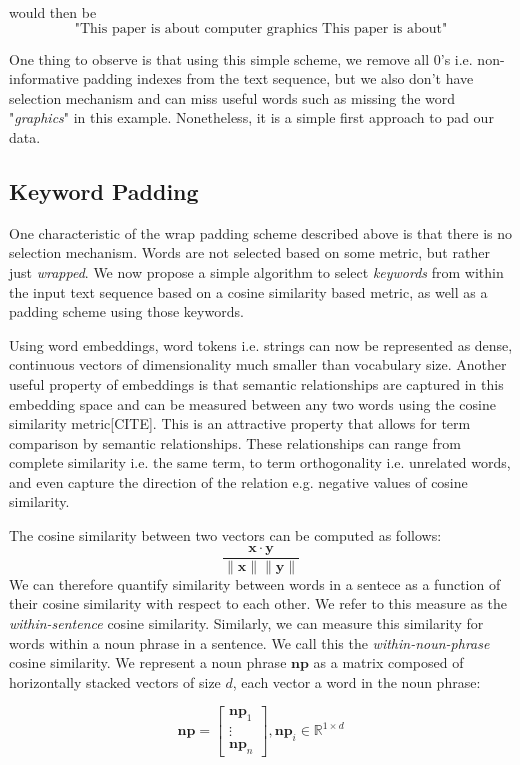 would then be
\[\text{"This paper is about computer graphics This paper is about"}\]

One thing to observe is that using this simple scheme, we remove all 0's i.e. non-informative padding indexes
from the text sequence, but we also don't have selection mechanism and can miss useful words such as missing the
word "\textit{graphics}" in this example. Nonetheless, it is a simple first approach to pad our data.

\subsection{Keyword Padding}
One characteristic of the wrap padding scheme described above is that there is no selection mechanism. Words are not selected based on some metric,
but rather just \textit{wrapped}. We now propose a simple algorithm to select \textit{keywords} from within the input text sequence
based on a cosine similarity based metric, as well as a padding scheme using those keywords.

Using word embeddings, word tokens i.e. strings can now be represented as dense, continuous vectors of dimensionality much smaller than
vocabulary size. Another useful property of embeddings is that semantic relationships are captured
in this embedding space and can be measured between any two words using the cosine
similarity metric[CITE]. This is an attractive property that allows for term comparison
by semantic relationships. These relationships can range from complete similarity i.e. the
same term, to term orthogonality i.e. unrelated words, and even capture the direction of
the relation e.g. negative values of cosine similarity.

The cosine similarity between two vectors can be computed as follows:
\[
  \frac{\mathbf{x} \cdot \mathbf{y}}{\lVert \mathbf{x} \rVert \lVert \mathbf{y} \rVert}
\]
We can therefore quantify similarity between words in a sentece as a function of their
cosine similarity with respect to each other. We refer to this measure as the \textit{within-sentence}
cosine similarity. Similarly, we can measure this similarity for words within a noun phrase
in a sentence. We call this the \textit{within-noun-phrase} cosine similarity.
We represent a noun phrase $\mathbf{np}$ as a matrix composed of horizontally stacked vectors of size $d$, each vector a word in the noun phrase:

\[\mathbf{np} = \begin{bmatrix}
    \bm{np}_{1}   \\
    \vdots \\
    \bm{np}_{n}
  \end{bmatrix},
\bm{np}_{i} \in \mathbb{R}^{1 \times d}\]

